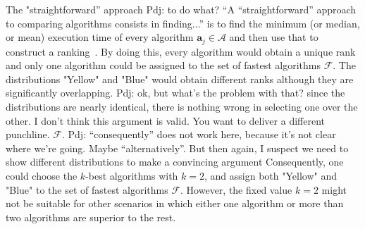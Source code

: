 \documentclass[conference]{IEEEtran}
\newcommand{\p}[1]{{\color{blue} Pdj: #1}}
\begin{document}
The "straightforward'' approach \p{to do what? ``A ``straightforward'' approach to comparing algorithms consists in
    finding...''} is to find the minimum (or median, or mean) execution time of every algorithm $\mathbf{a}_j \in
  \mathcal{A}$ and then use that to construct a ranking~\cite{peise2012performance}. By doing this, every algorithm
  would obtain a unique rank and only one algorithm could be assigned to the set of fastest algorithms
  $\mathcal{F}$. The distributions "Yellow" and "Blue" would obtain different ranks although they are significantly
  overlapping.  
  \p{ok, but what's the problem with that? since the distributions are nearly identical, there is nothing wrong in
    selecting one over the other. I don't think this argument is valid. You want to deliver a different punchline.}
  $\mathcal{F}$. 
  \p{``consequently'' does not work here, because it's not clear where we're going.
    Maybe ``alternatively''. But then again, I suspect we need to show different distributions to make a convincing argument}
  Consequently, one could choose the $k$-best algorithms\cite{kbest-kadioglu2011algorithm} with $k=2$, and  assign both
  "Yellow" and "Blue" to the set of fastest algorithms $\mathcal{F}$. However, the fixed value $k=2$  might not be
  suitable for other scenarios in which either one algorithm or more than two algorithms are superior to the rest. 

\end{document}
